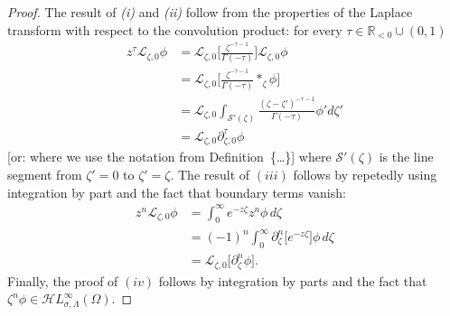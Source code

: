 \documentclass{article}
\newcommand{\singexp}[2]{\mathcal{H}L^\infty_{#1, #2}}
\newcommand{\R}{\mathbb{R}}
\newcommand{\fracderiv}[3]{\partial^{#1}_{#2, #3}}
\newcommand{\laplace}{\mathcal{L}}
\theoremstyle{definition}
\theoremstyle{plain}
\newenvironment{todo}{\color{Coral}}{\color{black}}
\begin{document}
\begin{proof}
   
   The result of \emph{(i)} and \emph{(ii)} follow from the properties of the Laplace transform with respect to the convolution product: for every $\tau\in\R_{<0}\cup(0,1)$
    \begin{align*}
z^\tau\laplace_{\zeta,0}\phi&=\laplace_{\zeta,0}\Big[\frac{\zeta^{-\tau-1}}{\Gamma(-\tau)}\Big] \laplace_{\zeta,0}\phi\\
&=\laplace_{\zeta,0}\Big[\frac{\zeta^{-\tau-1}}{\Gamma(-\tau)} \ast_\zeta \phi\Big] \\
&=\laplace_{\zeta,0} \int_{\mathcal{S}'(\zeta)}\frac{(\zeta-\zeta')^{-\tau-1}}{\Gamma(-\tau)} \phi' d\zeta'\\
&=\laplace_{\zeta,0}\fracderiv{\tau}{\zeta}{0}\phi
\end{align*}
\begin{todo}[or: where we use the notation from Definition~\{\ldots\}]\end{todo} where $\mathcal{S}'(\zeta)$ is the line segment from $\zeta'=0$ to $\zeta' = \zeta$. The result of $(iii)$ follows by repetedly using integration by part and the fact that boundary terms vanish:
\begin{align*}
    z^n\laplace_{\zeta,0}\phi&=\int_0^\infty e^{-z\zeta} z^n \phi \, d\zeta\\
    &=(-1)^n\int_0^\infty \partial_\zeta^n \big[e^{-z\zeta}\big]  \phi\, d\zeta\\
    &=\laplace_{\zeta,0}\big[\partial_\zeta^n \phi\big].
\end{align*}
     Finally, the proof of $(iv)$ follows by integration by parts and the fact that $\zeta^n\phi\in\singexp{\sigma}{\Lambda}(\Omega)$.   
\end{proof}
\end{document}
